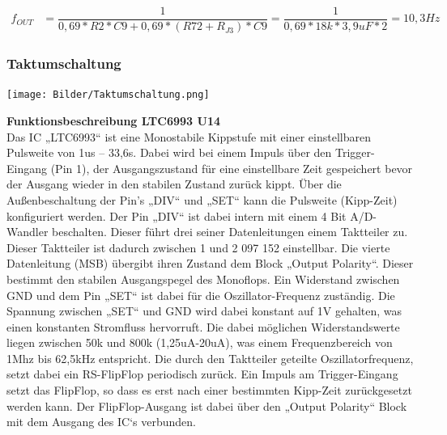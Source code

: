 \documentclass[a4paper,11pt]{scrartcl}
\begin{document}
\begin{center}
\begin{align}
	f_{OUT} &= \dfrac{1}{0,69*R2*C9 + 0,69*(R72+R_{J3})* C9} = \dfrac{1}{0,69*18k*3,9uF*2} = 10,3Hz
\end{align} 
\end{center}

\newpage
\subsubsection{Taktumschaltung}

\begin{center}
\texttt{[image: Bilder/Taktumschaltung.png]}
\end{center}


\textbf{Funktionsbeschreibung LTC6993 U14}
\\
Das IC „LTC6993“ ist eine Monostabile Kippstufe mit einer einstellbaren Pulsweite von 1us – 33,6s. Dabei wird bei einem Impuls über den Trigger-Eingang (Pin 1), der Ausgangszustand für eine einstellbare Zeit gespeichert bevor der Ausgang wieder in den stabilen Zustand zurück kippt. Über die Außenbeschaltung der Pin’s „DIV“ und „SET“ kann die Pulsweite (Kipp-Zeit) konfiguriert werden. Der Pin „DIV“ ist dabei intern mit einem 4 Bit A/D-Wandler beschalten. Dieser führt drei seiner Datenleitungen einem Taktteiler zu. Dieser Taktteiler ist dadurch zwischen 1 und 2 097 152 einstellbar. Die vierte Datenleitung (MSB) übergibt ihren Zustand dem Block „Output Polarity“. Dieser bestimmt den stabilen Ausgangspegel des Monoflops. Ein Widerstand zwischen GND und dem Pin „SET“ ist dabei für die Oszillator-Frequenz zuständig. Die Spannung zwischen „SET“ und GND wird dabei konstant auf 1V gehalten, was einen konstanten Stromfluss hervorruft. Die dabei möglichen Widerstandswerte liegen zwischen 50k und 800k (1,25uA-20uA), was einem Frequenzbereich von 1Mhz bis 62,5kHz entspricht. Die durch den Taktteiler geteilte Oszillatorfrequenz, setzt dabei ein RS-FlipFlop periodisch zurück. Ein Impuls am Trigger-Eingang setzt das FlipFlop, so dass es erst nach einer bestimmten Kipp-Zeit zurückgesetzt werden kann. Der FlipFlop-Ausgang ist dabei über den „Output Polarity“ Block mit dem Ausgang des IC‘s verbunden.

\newpage
\end{document}
